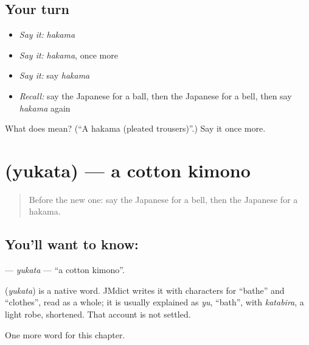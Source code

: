 \subsection*{Your turn}
\begin{itemize}
\raggedright
  \item \emph{Say it:} \emph{hakama}
  \item \emph{Say it:} \emph{hakama}, once more
  \item \emph{Say it:} say \emph{hakama}
  \item \emph{Recall:} say the Japanese for a ball, then the Japanese for a bell, then say \emph{hakama} again
\end{itemize}

\begin{tcolorbox}[breakable,colback=teal!4,colframe=teal!35!black,title={Before you move on}]
What does  mean? (\textquotedblleft{}A hakama (pleated trousers)\textquotedblright{}.) Say it once more.
\end{tcolorbox}
\section[\texorpdfstring{\ja{ゆかた} (yukata)}{ゆかた (yukata)}]{ (yukata) — a cotton kimono}

\label{lesson:JA-C105-yukata}



\begin{quote}
Before the new one: say the Japanese for a bell, then the Japanese for a hakama.
\end{quote}

\subsection*{You'll want to know: }
\textbf{} — \emph{yukata} — \textquotedblleft{}a cotton kimono\textquotedblright{}.

\begin{cousinweb}
\textbf{} (\emph{yukata}) is a native word. JMdict writes it with characters for \textquotedblleft{}bathe\textquotedblright{} and \textquotedblleft{}clothes\textquotedblright{}, read as a whole; it is usually explained as \emph{yu}, \textquotedblleft{}bath\textquotedblright{}, with \emph{katabira}, a light robe, shortened. That account is not settled.
\end{cousinweb}

\begin{grammarlens}[title={What you've built}]
One more word for this chapter.
\end{grammarlens}

